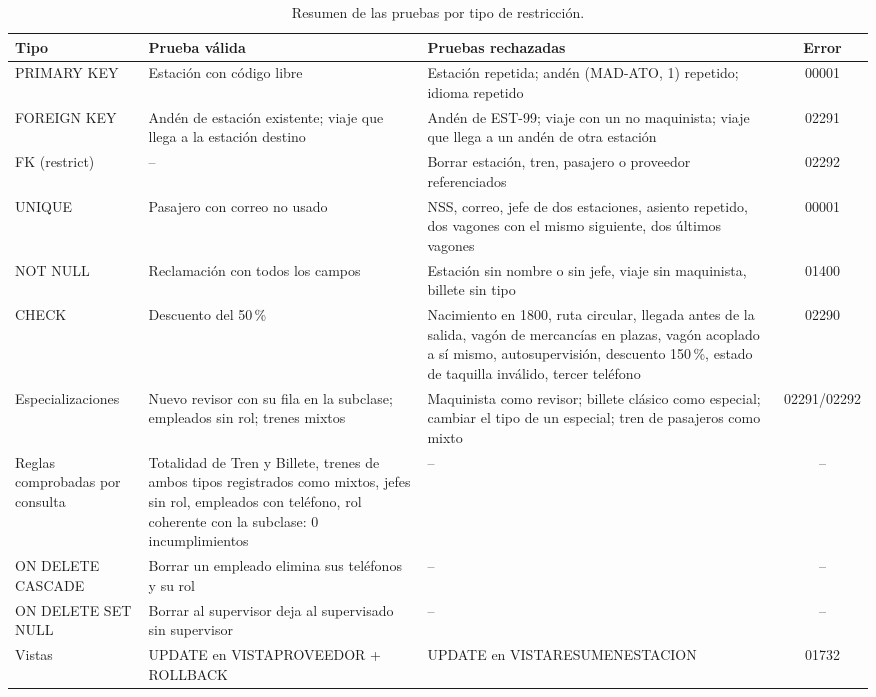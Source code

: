 \documentclass[11pt,a4paper]{article}
\DeclareRobustCommand{\_}{\textunderscore\allowbreak}
\begin{document}
\begin{table}[!htbp]
\centering\small
\caption{Resumen de las pruebas por tipo de restricción.}
\begin{tabularx}{\linewidth}{>{\raggedright\arraybackslash}p{2.6cm} >{\raggedright\arraybackslash}X >{\raggedright\arraybackslash}X c}
\toprule
\textbf{Tipo} & \textbf{Prueba válida} & \textbf{Pruebas rechazadas} & \textbf{Error} \\
\midrule
PRIMARY KEY & Estación con código libre & Estación repetida; andén (MAD-ATO, 1) repetido; idioma repetido & 00001 \\
FOREIGN KEY & Andén de estación existente; viaje que llega a la estación destino & Andén de EST-99; viaje con un no maquinista; viaje que llega a un andén de otra estación & 02291 \\
FK (restrict) & -- & Borrar estación, tren, pasajero o proveedor referenciados & 02292 \\
UNIQUE & Pasajero con correo no usado & NSS, correo, jefe de dos estaciones, asiento repetido, dos vagones con el mismo siguiente, dos últimos vagones & 00001 \\
NOT NULL & Reclamación con todos los campos & Estación sin nombre o sin jefe, viaje sin maquinista, billete sin tipo & 01400 \\
CHECK & Descuento del 50\,\% & Nacimiento en 1800, ruta circular, llegada antes de la salida, vagón de mercancías en plazas, vagón acoplado a sí mismo, autosupervisión, descuento 150\,\%, estado de taquilla inválido, tercer teléfono & 02290 \\
Especializaciones & Nuevo revisor con su fila en la subclase; empleados sin rol; trenes mixtos & Maquinista como revisor; billete clásico como especial; cambiar el tipo de un especial; tren de pasajeros como mixto & 02291/02292 \\
Reglas comprobadas por consulta & Totalidad de Tren y Billete, trenes de ambos tipos registrados como mixtos, jefes sin rol, empleados con teléfono, rol coherente con la subclase: 0 incumplimientos & -- & -- \\
ON DELETE CASCADE & Borrar un empleado elimina sus teléfonos y su rol & -- & -- \\
ON DELETE SET NULL & Borrar al supervisor deja al supervisado sin supervisor & -- & -- \\
Vistas & UPDATE en VISTA\_PROVEEDOR + ROLLBACK & UPDATE en VISTA\_RESUMEN\_ESTACION & 01732 \\
\bottomrule
\end{tabularx}
\end{table}
\end{document}
